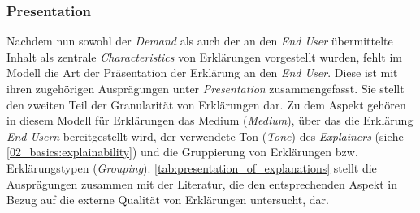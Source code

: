 \subsubsection{Presentation}

Nachdem nun sowohl der \textit{Demand} als auch der an den \textit{End User} übermittelte Inhalt als zentrale \textit{Characteristics} von Erklärungen vorgestellt wurden, fehlt im Modell die Art der Präsentation der Erklärung an den \textit{End User}. Diese ist mit ihren zugehörigen Ausprägungen unter \textit{Presentation} zusammengefasst. Sie stellt den zweiten Teil der Granularität von Erklärungen dar. Zu dem Aspekt gehören in diesem Modell für Erklärungen das Medium (\textit{Medium}), über das die Erklärung \textit{End Usern} bereitgestellt wird, der verwendete Ton (\textit{Tone}) des \textit{Explainers} (siehe \autoref{02_basics:explainability}) \cite[vgl.][]{chazette_knowledge_nodate} und die Gruppierung von Erklärungen bzw. Erklärungstypen (\textit{Grouping}). \autoref{tab:presentation_of_explanations} stellt die Ausprägungen zusammen mit der Literatur, die den entsprechenden Aspekt in Bezug auf die externe Qualität von Erklärungen untersucht, dar.

